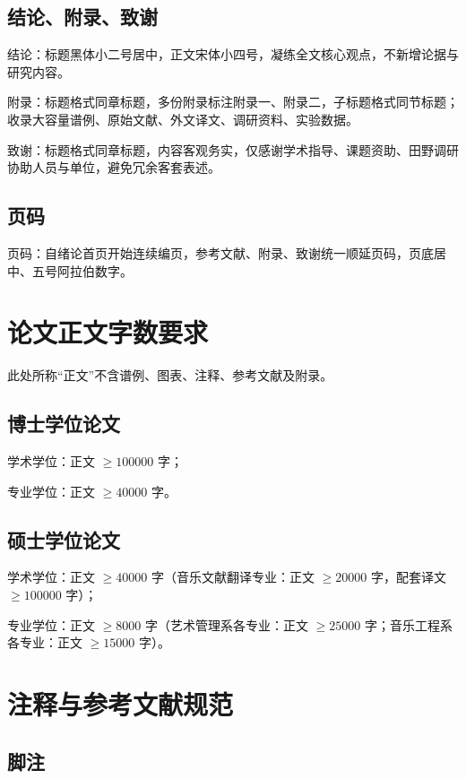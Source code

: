 \subsection{结论、附录、致谢}

结论：标题黑体小二号居中，正文宋体小四号，凝练全文核心观点，不新增论据与研究内容。

附录：标题格式同章标题，多份附录标注附录一、附录二，子标题格式同节标题；收录大容量谱例、原始文献、外文译文、调研资料、实验数据。

致谢：标题格式同章标题，内容客观务实，仅感谢学术指导、课题资助、田野调研协助人员与单位，避免冗余客套表述。

\subsection{页码}

页码：自绪论首页开始连续编页，参考文献、附录、致谢统一顺延页码，页底居中、五号阿拉伯数字。

\section{论文正文字数要求}

此处所称“正文”不含谱例、图表、注释、参考文献及附录。

\subsection{博士学位论文}

学术学位：正文 $\geq 100000$ 字；

专业学位：正文 $\geq 40000$ 字。

\subsection{硕士学位论文}

学术学位：正文 $\geq 40000$ 字（音乐文献翻译专业：正文 $\geq 20000$ 字，配套译文 $\geq 100000$ 字）；

专业学位：正文 $\geq 8000$ 字（艺术管理系各专业：正文 $\geq 25000$ 字；音乐工程系各专业：正文 $\geq 15000$ 字）。

\section{注释与参考文献规范}

\subsection{脚注}


